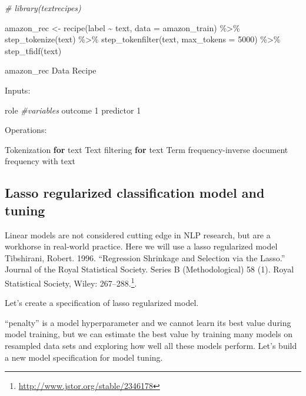 \documentclass[
]{article}
\newenvironment{Shaded}{}{}
\newcommand{\AttributeTok}[1]{\textcolor[rgb]{0.49,0.56,0.16}{#1}}
\newcommand{\CommentTok}[1]{\textcolor[rgb]{0.38,0.63,0.69}{\textit{#1}}}
\newcommand{\ControlFlowTok}[1]{\textcolor[rgb]{0.00,0.44,0.13}{\textbf{#1}}}
\newcommand{\DecValTok}[1]{\textcolor[rgb]{0.25,0.63,0.44}{#1}}
\newcommand{\FunctionTok}[1]{\textcolor[rgb]{0.02,0.16,0.49}{#1}}
\newcommand{\NormalTok}[1]{#1}
\newcommand{\OtherTok}[1]{\textcolor[rgb]{0.00,0.44,0.13}{#1}}
\newcommand{\SpecialCharTok}[1]{\textcolor[rgb]{0.25,0.44,0.63}{#1}}
\DeclareRobustCommand{\href}[2]{#2\footnote{\url{#1}}}
\begin{document}
\begin{Shaded}
\begin{Highlighting}[]
\CommentTok{\# library(textrecipes)}

\NormalTok{amazon\_rec }\OtherTok{\textless{}{-}} \FunctionTok{recipe}\NormalTok{(label }\SpecialCharTok{\textasciitilde{}}\NormalTok{ text, }\AttributeTok{data =}\NormalTok{ amazon\_train) }\SpecialCharTok{\%\textgreater{}\%}
    \FunctionTok{step\_tokenize}\NormalTok{(text) }\SpecialCharTok{\%\textgreater{}\%}
    \FunctionTok{step\_tokenfilter}\NormalTok{(text, }\AttributeTok{max\_tokens =} \DecValTok{5000}\NormalTok{) }\SpecialCharTok{\%\textgreater{}\%}
    \FunctionTok{step\_tfidf}\NormalTok{(text)}

\NormalTok{amazon\_rec}
\NormalTok{Data Recipe}

\NormalTok{Inputs}\SpecialCharTok{:}

\NormalTok{      role }\CommentTok{\#variables}
\NormalTok{   outcome          }\DecValTok{1}
\NormalTok{ predictor          }\DecValTok{1}

\NormalTok{Operations}\SpecialCharTok{:}

\NormalTok{Tokenization }\ControlFlowTok{for}\NormalTok{ text}
\NormalTok{Text filtering }\ControlFlowTok{for}\NormalTok{ text}
\NormalTok{Term frequency}\SpecialCharTok{{-}}\NormalTok{inverse document frequency with text}
\end{Highlighting}
\end{Shaded}

\hypertarget{lasso-regularized-classification-model-and-tuning}{%
\subsection{Lasso regularized classification model and
tuning}\label{lasso-regularized-classification-model-and-tuning}}

Linear models are not considered cutting edge in NLP research, but are a
workhorse in real-world practice. Here we will use a lasso regularized
model \href{http://www.jstor.org/stable/2346178}{Tibshirani, Robert.
1996. ``Regression Shrinkage and Selection via the Lasso.'' Journal of
the Royal Statistical Society. Series B (Methodological) 58 (1). Royal
Statistical Society, Wiley: 267--288.}.

Let's create a specification of lasso regularized model.

``penalty'' is a model hyperparameter and we cannot learn its best value
during model training, but we can estimate the best value by training
many models on resampled data sets and exploring how well all these
models perform. Let's build a new model specification for model tuning.
\end{document}
